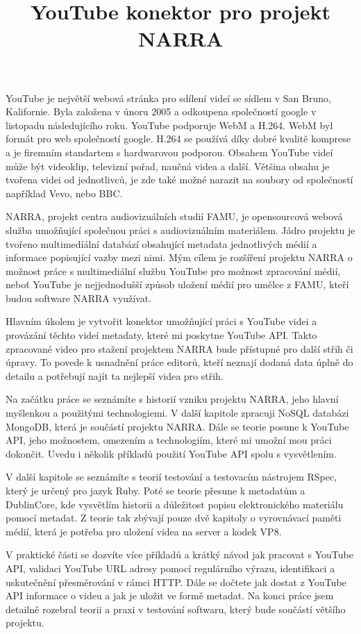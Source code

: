 \documentclass[thesis=B,czech]{FITthesis}[2012/06/26]
\title{YouTube konektor pro projekt NARRA}
\begin{document}

\begin{introduction}
\par YouTube je největší webová stránka pro sdílení videí se sídlem v San Bruno, Kalifornie. Byla založena v únoru 2005 a odkoupena společností google v listopadu následujícího roku. YouTube podporuje WebM a H.264. WebM byl formát pro web společností google. H.264 se používá díky dobré kvalitě komprese a je firemním standartem s hardwarovou podporou. Obsahem YouTube videí může být videoklip, televizní pořad, naučná videa a další. Většina obsahu je tvořena videi od jednotlivců, je zde také možné narazit na soubory od společností například Vevo, nebo BBC.
\par NARRA, projekt centra audiovizuálních studií FAMU, je opensourcová webová služba umožňující společnou práci s audiovizuálním materiálem. Jádro projektu je tvořeno multimedíální databází obsahující metadata jednotlivých médií a informace popisující vazby mezi nimi. Mým cílem je rozšíření projektu NARRA o možnost práce s multimediální službu YouTube pro možnost zpracování médií, neboť YouTube je nejjednodušší způsob uložení médií pro umělce z FAMU, kteří budou software NARRA využívat.
\par Hlavním úkolem je vytvořit konektor umožňující práci s YouTube videi a provázání těchto videí metadaty, které mi poskytne YouTube API. Takto zpracované video pro stažení projektem NARRA bude přístupné pro další střih či úpravy. To povede k usnadnění práce editorů, kteří neznají dodaná data úplně do detailu a potřebují najít ta nejlepší videa pro střih. 
\par Na začátku práce se seznámíte s historií vzniku projektu NARRA, jeho hlavní myšlenkou a použitými technologiemi. V další kapitole zpracuji NoSQL databázi MongoDB, která je součástí projektu NARRA. Dále se teorie posune k YouTube API, jeho možnostem, omezením a technologiím, které mi umožní mou práci dokončit. Uvedu i několik příkladů použití YouTube API spolu s vysvětlením.
\par V další kapitole se seznámíte s teorií testování a testovacím nástrojem RSpec, který je určený pro jazyk Ruby. Poté se teorie přesune k metadatům a DublinCore, kde vysvětlím historii a důležitost popisu elektronického materiálu pomocí metadat. Z teorie tak zbývají pouze dvě kapitoly o vyrovnávací paměti médií, která je potřeba pro uložení videa na server a kodek VP8.
\par V praktické části se dozvíte více příkladů a krátký návod jak pracovat s YouTube API, validaci YouTube URL adresy pomocí regulárního výrazu, identifikaci a uskutečnění přesměrování v rámci HTTP. Dále se dočtete jak dostat z YouTube API informace o videu a jak je uložit ve formě metadat. Na konci práce jsem detailně rozebral teorii a praxi v testování softwaru, který bude součástí většího projektu.
\end{introduction}
\end{document}
